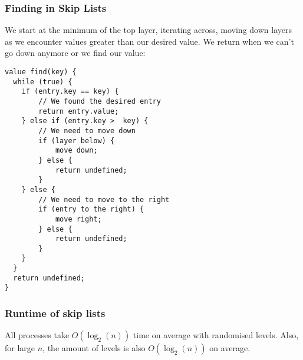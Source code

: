 \newpage

\subsubsection{Finding in Skip Lists}

We start at the minimum of the top layer, iterating across, moving down layers
as we encounter values greater than our desired value. We return when we can't
go down anymore or we find our value: \begin{lstlisting}
value find(key) {
  while (true) {
    if (entry.key == key) {
        // We found the desired entry
        return entry.value;
    } else if (entry.key >  key) {
        // We need to move down
        if (layer below) {
            move down;
        } else {
            return undefined;
        }
    } else {
        // We need to move to the right
        if (entry to the right) {
            move right;
        } else {
            return undefined;
        }
    }
  }
  return undefined;
}
\end{lstlisting}

\subsubsection{Runtime of skip lists}

All processes take $O(\log_2(n))$ time on average with randomised levels. Also,
for large $n$, the amount of levels is also $O(\log_2(n))$ on average.
